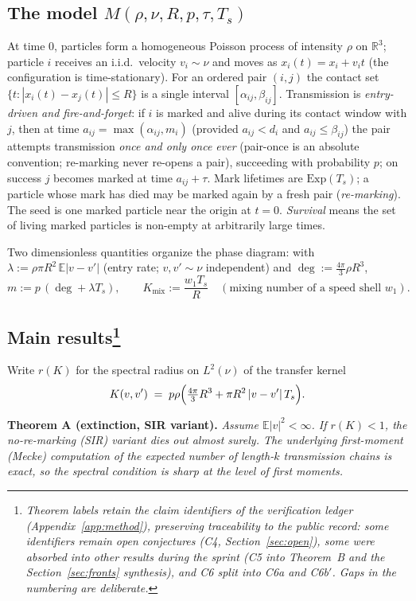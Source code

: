 \documentclass[11pt]{article}
\newenvironment{namedthm}[1]{\par\medskip\noindent\textbf{#1.}\itshape}{\par\medskip}
\newcommand{\E}{\mathbb{E}}
\newcommand{\R}{\mathbb{R}}
\newcommand{\Kmix}{K_{\mathrm{mix}}}
\newcommand{\Ts}{T_s}
\begin{document}
\subsection*{The model $M(\rho,\nu,R,p,\tau,\Ts)$}
At time $0$, particles form a homogeneous Poisson process of intensity
$\rho$ on $\R^3$; particle $i$ receives an i.i.d.\ velocity $v_i\sim\nu$ and
moves as $x_i(t)=x_i+v_i t$ (the configuration is time-stationary). For an
ordered pair $(i,j)$ the contact set $\{t:|x_i(t)-x_j(t)|\le R\}$ is a single
interval $[\alpha_{ij},\beta_{ij}]$. Transmission is \emph{entry-driven and
fire-and-forget}: if $i$ is marked and alive during its contact window with
$j$, then at time $a_{ij}=\max(\alpha_{ij},m_i)$ (provided $a_{ij}<d_i$ and
$a_{ij}\le\beta_{ij}$) the pair attempts transmission \emph{once and only
once ever} (pair-once is an absolute convention; re-marking never re-opens a
pair), succeeding with probability $p$; on success $j$ becomes marked at
time $a_{ij}+\tau$. Mark lifetimes are $\mathrm{Exp}(\Ts)$; a particle whose
mark has died may be marked again by a fresh pair (\emph{re-marking}).
The seed is one marked particle near the origin at $t=0$. \emph{Survival}
means the set of living marked particles is non-empty at arbitrarily large
times.

Two dimensionless quantities organize the phase diagram: with
$\lambda:=\rho\pi R^2\,\E|v-v'|$ (entry rate; $v,v'\sim\nu$ independent) and
$\deg:=\tfrac{4\pi}{3}\rho R^3$,
\[
  m := p\,(\deg+\lambda \Ts), \qquad
  \Kmix := \frac{w_1\Ts}{R}\quad(\text{mixing number of a speed shell }w_1).
\]

\subsection*{Main results\protect\footnote{\emph{Theorem labels retain
the claim identifiers of the verification ledger
(Appendix~\ref{app:method}), preserving traceability to the public
record: some identifiers remain open conjectures (C4,
Section~\ref{sec:open}), some were absorbed into other results during the
sprint (C5 into Theorem~B and the Section~\ref{sec:fronts} synthesis), and
C6 split into C6a and C6b$'$. Gaps in the numbering are deliberate.}}}
Write $r(K)$ for the spectral radius on $L^2(\nu)$ of the transfer kernel
\[
  K(v,v') \;=\; p\rho\Bigl(\tfrac{4\pi}{3}R^3+\pi R^2\,|v-v'|\,\Ts\Bigr).
\]

\begin{namedthm}{Theorem A (extinction, SIR variant)}
Assume $\E|v|^2<\infty$. If $r(K)<1$, the no-re-marking (SIR) variant dies
out almost surely. The underlying first-moment (Mecke) computation of the
expected number of length-$k$ transmission chains is exact, so the spectral
condition is sharp at the level of first moments.
\end{namedthm}
\end{document}

